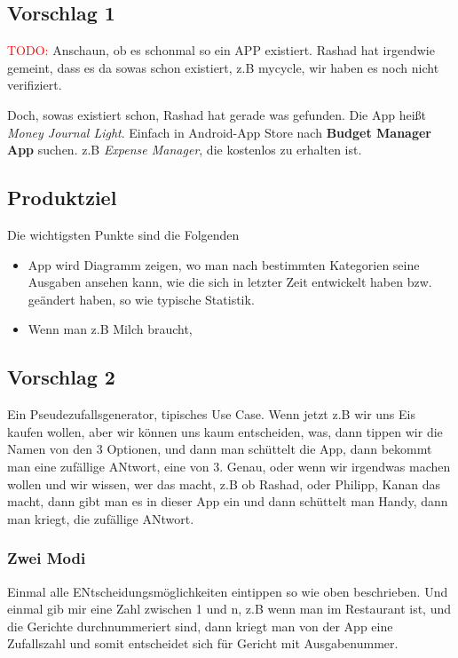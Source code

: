 \subsection{Vorschlag 1}


\textcolor{red}{TODO:} Anschaun, ob es schonmal so ein APP existiert. Rashad hat irgendwie gemeint, dass es da sowas schon existiert, z.B mycycle, wir haben es noch nicht verifiziert. 

\vspace{0.2cm}

Doch, sowas existiert schon, Rashad hat gerade was gefunden. Die App heißt \emph{Money Journal Light}. Einfach in Android-App Store nach \textbf{Budget Manager App} suchen. z.B \emph{Expense Manager}, die kostenlos zu erhalten ist. 


\subsection{Produktziel} 
Die wichtigsten Punkte sind die Folgenden
\begin{itemize}
\item App wird Diagramm zeigen, wo man nach bestimmten Kategorien seine Ausgaben ansehen kann, wie die sich in letzter Zeit entwickelt haben bzw. geändert haben, so wie typische Statistik.
\item Wenn man z.B Milch braucht, 
\end{itemize}


\subsection{Vorschlag 2}
Ein Pseudezufallsgenerator, tipisches Use Case. Wenn jetzt z.B wir uns Eis kaufen wollen, aber wir können uns kaum entscheiden, was, dann tippen wir die Namen von den 3 Optionen, und dann man schüttelt die App, dann bekommt man eine zufällige ANtwort, eine von 3. Genau, oder wenn wir irgendwas machen wollen und wir wissen, wer das macht, z.B ob Rashad, oder Philipp, Kanan das macht, dann gibt man es in dieser App ein und dann schüttelt man Handy, dann man kriegt, die zufällige ANtwort. 


\subsubsection{Zwei Modi}
Einmal alle ENtscheidungsmöglichkeiten eintippen so wie oben beschrieben. Und einmal gib mir eine Zahl zwischen 1 und n, z.B wenn man im Restaurant ist, und die Gerichte durchnummeriert sind, dann kriegt man von der App eine Zufallszahl und somit entscheidet sich für Gericht mit Ausgabenummer. 


